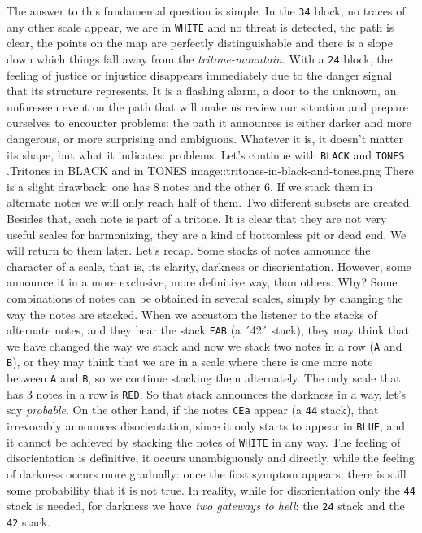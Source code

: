 \documentclass[]{report}
\begin{document}
The answer to this fundamental question is simple. In the \texttt{34} block, no traces of any other scale appear, we are in \texttt{WHITE} and no threat is detected, the path is clear, the points on the map are perfectly distinguishable and there is a slope down which things fall away from the \emph{tritone-mountain}.
With a \texttt{24} block, the feeling of justice or injustice disappears immediately due to the danger signal that its structure represents. It is a flashing alarm, a door to the unknown, an unforeseen event on the path that will make us review our situation and prepare ourselves to encounter problems: the path it announces is either darker and more dangerous, or more surprising and ambiguous. Whatever it is, it doesn't matter its shape, but what it indicates: problems.
Let's continue with \texttt{BLACK} and \texttt{TONES}
.Tritones in BLACK and in TONES image::tritones-in-black-and-tones.png
There is a slight drawback: one has 8 notes and the other 6. If we stack them in alternate notes we will only reach half of them. Two different subsets are created. Besides that, each note is part of a tritone. It is clear that they are not very useful scales for harmonizing, they are a kind of bottomless pit or dead end. We will return to them later.
Let's recap. Some stacks of notes announce the character of a scale, that is, its clarity, darkness or disorientation. However, some announce it in a more exclusive, more definitive way, than others. Why?
Some combinations of notes can be obtained in several scales, simply by changing the way the notes are stacked. When we accustom the listener to the stacks of alternate notes, and they hear the stack \texttt{FAB} (a ´42´ stack), they may think that we have changed the way we stack and now we stack two notes in a row (\texttt{A} and \texttt{B}), or they may think that we are in a scale where there is one more note between \texttt{A} and \texttt{B}, so we continue stacking them alternately. The only scale that has 3 notes in a row is \texttt{RED}. So that stack announces the darkness in a way, let's say \emph{probable}.
On the other hand, if the notes \texttt{CEa} appear (a \texttt{44} stack), that irrevocably announces disorientation, since it only starts to appear in \texttt{BLUE}, and it cannot be achieved by stacking the notes of \texttt{WHITE} in any way.
The feeling of disorientation is definitive, it occurs unambiguously and directly, while the feeling of darkness occurs more gradually: once the first symptom appears, there is still some probability that it is not true.
In reality, while for disorientation only the \texttt{44} stack is needed, for darkness we have \emph{two gateways to hell}: the \texttt{24} stack and the \texttt{42} stack.
\end{document}
